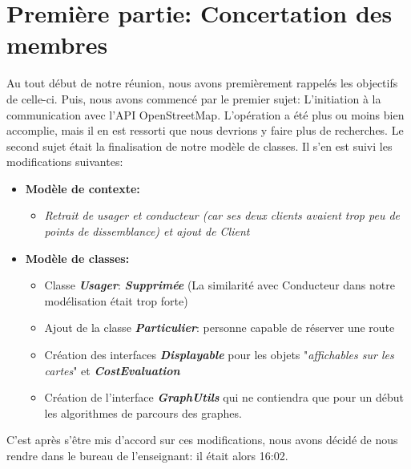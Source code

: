 \documentclass[12px]{article}
\begin{document}
\section{Première partie: Concertation des membres}
Au tout début de notre réunion, nous avons premièrement rappelés les objectifs de celle-ci.
Puis, nous avons commencé par le premier sujet: L'initiation à la communication avec l'API OpenStreetMap. L'opération a été plus ou moins bien accomplie, mais il en est ressorti que nous devrions y faire plus de recherches.
Le second sujet était la finalisation de notre modèle de classes. Il s'en est suivi les modifications suivantes:
\begin{itemize}
    \item \textbf{Modèle de contexte:}
    \begin{itemize}
        \item \textit{Retrait de usager et conducteur (car ses deux clients avaient trop peu de points de dissemblance) et ajout de Client}
    \end{itemize}
    \item \textbf{Modèle de classes:}
    \begin{itemize}
        \item Classe \textbf{\textit{Usager}}: \textbf{\textit{Supprimée}} (La similarité avec Conducteur dans notre modélisation était trop forte)
        \item Ajout de la classe \textbf{\textit{Particulier}}: personne capable de réserver une route
        \item Création des interfaces \textbf{\textit{Displayable}} pour les objets "\textit{affichables sur les cartes}" et \textbf{\textit{CostEvaluation}}
        \item Création de l'interface \textbf{\textit{GraphUtils}} qui ne contiendra que pour un début les algorithmes de parcours des graphes.
    \end{itemize}
\end{itemize}

C'est après s'être mis d'accord sur ces modifications, nous avons décidé de nous rendre dans le bureau de l'enseignant: il était alors 16:02.
\end{document}
